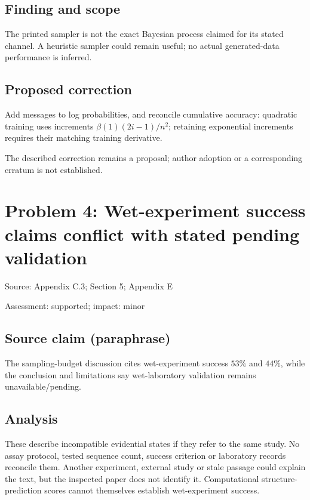 \documentclass[11pt]{article}
\begin{document}
\subsection*{Finding and scope}

The printed sampler is not the exact Bayesian process claimed for its stated channel. A heuristic sampler could remain useful; no actual generated-data performance is inferred.

\subsection*{Proposed correction}

Add messages to log probabilities, and reconcile cumulative accuracy: quadratic training uses increments \(\beta(1)(2i-1)/n^2\); retaining exponential increments requires their matching training derivative.

The described correction remains a proposal; author adoption or a corresponding erratum is not established.

\section*{Problem 4: Wet-experiment success claims conflict with stated pending validation}

Source: Appendix C.3; Section 5; Appendix E

Assessment: supported; impact: minor

\subsection*{Source claim (paraphrase)}

The sampling-budget discussion cites wet-experiment success \(53\%\) and \(44\%\), while the conclusion and limitations say wet-laboratory validation remains unavailable/pending.

\subsection*{Analysis}

These describe incompatible evidential states if they refer to the same study. No assay protocol, tested sequence count, success criterion or laboratory records reconcile them. Another experiment, external study or stale passage could explain the text, but the inspected paper does not identify it. Computational structure-prediction scores cannot themselves establish wet-experiment success.
\end{document}

